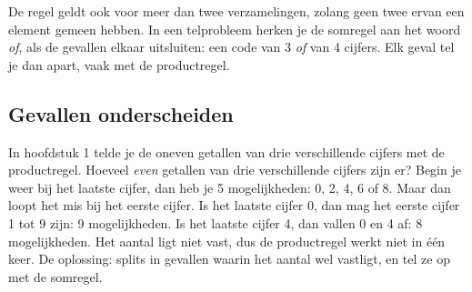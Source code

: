 De regel geldt ook voor meer dan twee verzamelingen, zolang geen twee ervan een element gemeen hebben. In een telprobleem herken je de somregel aan het woord \textit{of}, als de gevallen elkaar uitsluiten: een code van 3 \textit{of} van 4 cijfers. Elk geval tel je dan apart, vaak met de productregel.


\begin{oefeningen}
\end{oefeningen}

\subsection{Gevallen onderscheiden}

In hoofdstuk 1 telde je de oneven getallen van drie verschillende cijfers met de productregel. Hoeveel \textit{even} getallen van drie verschillende cijfers zijn er? Begin je weer bij het laatste cijfer, dan heb je 5 mogelijkheden: 0, 2, 4, 6 of 8. Maar dan loopt het mis bij het eerste cijfer. Is het laatste cijfer 0, dan mag het eerste cijfer 1 tot 9 zijn: 9 mogelijkheden. Is het laatste cijfer 4, dan vallen 0 en 4 af: 8 mogelijkheden. Het aantal ligt niet vast, dus de productregel werkt niet in één keer. De oplossing: splits in gevallen waarin het aantal wel vastligt, en tel ze op met de somregel.

